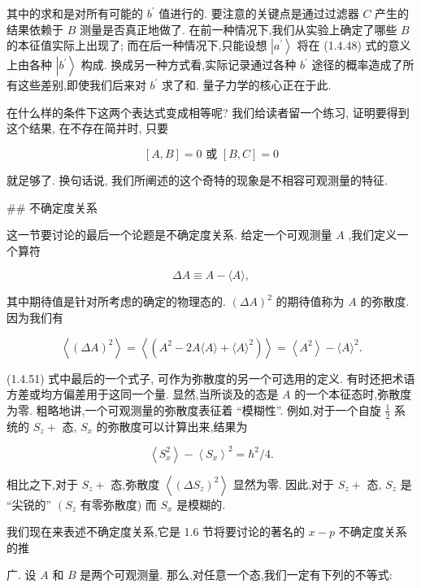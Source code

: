 \documentclass[lang=cn,newtx,10pt,scheme=chinese,thmcnt=section]{elegantbook}
\begin{document}
其中的求和是对所有可能的 ${b}^{\prime }$ 值进行的. 要注意的关键点是通过过滤器 $C$ 产生的结果依赖于 $B$ 测量是否真正地做了. 在前一种情况下,我们从实验上确定了哪些 $B$ 的本征值实际上出现了; 而在后一种情况下,只能设想 $\left| {a}^{\prime }\right\rangle$ 将在 (1.4.48) 式的意义上由各种 $\left| {b}^{\prime }\right\rangle$ 构成. 换成另一种方式看,实际记录通过各种 ${b}^{\prime }$ 途径的概率造成了所有这些差别,即使我们后来对 ${b}^{\prime }$ 求了和. 量子力学的核心正在于此.

在什么样的条件下这两个表达式变成相等呢? 我们给读者留一个练习, 证明要得到这个结果, 在不存在简并时, 只要

$$
\left\lbrack {A, B}\right\rbrack = 0\text{ 或 }\left\lbrack {B, C}\right\rbrack = 0 \tag{1.4.49}
$$

就足够了. 换句话说, 我们所阐述的这个奇特的现象是不相容可观测量的特征.

## 不确定度关系

这一节要讨论的最后一个论题是不确定度关系. 给定一个可观测量 $A$ ,我们定义一个算符

$$
{\Delta A} \equiv A - \langle A\rangle , \tag{1. 4.50}
$$

其中期待值是针对所考虑的确定的物理态的. ${\left( \Delta A\right) }^{2}$ 的期待值称为 $A$ 的弥散度. 因为我们有

$$
\left\langle {\left( \Delta A\right) }^{2}\right\rangle = \left\langle \left( {{A}^{2} - {2A}\langle A\rangle +\langle A{\rangle }^{2}}\right) \right\rangle = \left\langle {A}^{2}\right\rangle - \langle A{\rangle }^{2}. \tag{1. 4.51}
$$

(1.4.51) 式中最后的一个式子, 可作为弥散度的另一个可选用的定义. 有时还把术语方差或均方偏差用于这同一个量. 显然,当所谈及的态是 $A$ 的一个本征态时,弥散度为零. 粗略地讲,一个可观测量的弥散度表征着 “模糊性”. 例如,对于一个自旋 $\frac{1}{2}$ 系统的 ${S}_{z} +$ 态, ${S}_{x}$ 的弥散度可以计算出来,结果为

$$
\left\langle {S}_{x}^{2}\right\rangle - {\left\langle {S}_{x}\right\rangle }^{2} = {\hbar }^{2}/4. \tag{1. 4.52}
$$

相比之下,对于 ${S}_{z} +$ 态,弥散度 $\left\langle {\left( \Delta {S}_{z}\right) }^{2}\right\rangle$ 显然为零. 因此,对于 ${S}_{z} +$ 态, ${S}_{z}$ 是 “尖锐的” $\left( {S}_{z}\right.$ 有零弥散度) 而 ${S}_{x}$ 是模糊的.

我们现在来表述不确定度关系,它是 1.6 节将要讨论的著名的 $x - p$ 不确定度关系的推

广. 设 $A$ 和 $B$ 是两个可观测量. 那么,对任意一个态,我们一定有下列的不等式:
\end{document}

